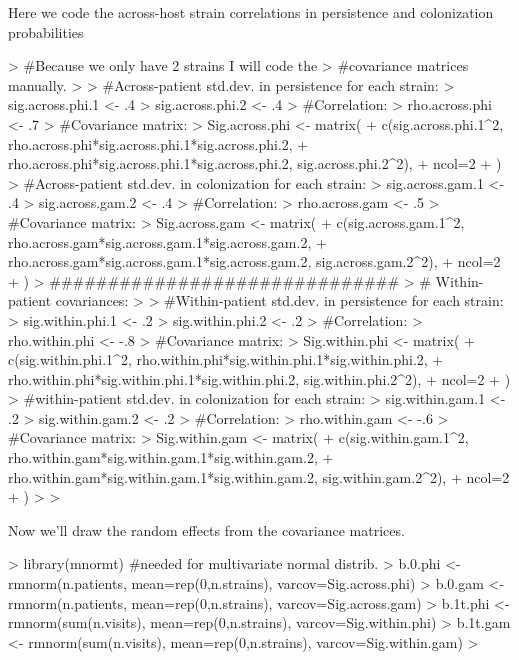 \documentclass{article}
\begin{document}
Here we code the across-host strain correlations in persistence and colonization probabilities
\begin{Schunk}
\begin{Sinput}
> #Because we only have 2 strains I will code the
> #covariance matrices manually.
> 
> #Across-patient std.dev. in persistence for each strain:
> sig.across.phi.1 <- .4
> sig.across.phi.2 <- .4
> #Correlation:
> rho.across.phi <- .7
> #Covariance matrix:
> Sig.across.phi <- matrix(
+   c(sig.across.phi.1^2, rho.across.phi*sig.across.phi.1*sig.across.phi.2,
+     rho.across.phi*sig.across.phi.1*sig.across.phi.2, sig.across.phi.2^2),
+   ncol=2
+   )
> #Across-patient std.dev. in colonization for each strain:
> sig.across.gam.1 <- .4
> sig.across.gam.2 <- .4
> #Correlation:
> rho.across.gam <- .5
> #Covariance matrix:
> Sig.across.gam <- matrix(
+   c(sig.across.gam.1^2, rho.across.gam*sig.across.gam.1*sig.across.gam.2,
+     rho.across.gam*sig.across.gam.1*sig.across.gam.2, sig.across.gam.2^2),
+   ncol=2
+   )
> ##############################
> # Within-patient covariances:
> 
> #Within-patient std.dev. in persistence for each strain:
> sig.within.phi.1 <- .2
> sig.within.phi.2 <- .2
> #Correlation:
> rho.within.phi <- -.8
> #Covariance matrix:
> Sig.within.phi <- matrix(
+   c(sig.within.phi.1^2, rho.within.phi*sig.within.phi.1*sig.within.phi.2,
+     rho.within.phi*sig.within.phi.1*sig.within.phi.2, sig.within.phi.2^2),
+   ncol=2
+   )
> #within-patient std.dev. in colonization for each strain:
> sig.within.gam.1 <- .2
> sig.within.gam.2 <- .2
> #Correlation:
> rho.within.gam <- -.6
> #Covariance matrix:
> Sig.within.gam <- matrix(
+   c(sig.within.gam.1^2, rho.within.gam*sig.within.gam.1*sig.within.gam.2,
+     rho.within.gam*sig.within.gam.1*sig.within.gam.2, sig.within.gam.2^2),
+   ncol=2
+   )
> 
> 
\end{Sinput}
\end{Schunk}

Now we'll draw the random effects from the covariance matrices.
\begin{Schunk}
\begin{Sinput}
> library(mnormt) #needed for multivariate normal distrib.
> b.0.phi <- rmnorm(n.patients, mean=rep(0,n.strains), varcov=Sig.across.phi) 
> b.0.gam <- rmnorm(n.patients, mean=rep(0,n.strains), varcov=Sig.across.gam)
> b.1t.phi <- rmnorm(sum(n.visits), mean=rep(0,n.strains), varcov=Sig.within.phi)
> b.1t.gam <- rmnorm(sum(n.visits), mean=rep(0,n.strains), varcov=Sig.within.gam)
> 
\end{Sinput}
\end{Schunk}
\end{document}
